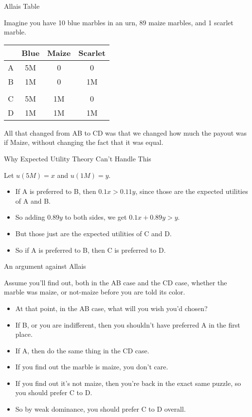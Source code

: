\documentclass[
  ignorenonframetext,
]{beamer}
\providecommand{\tightlist}{%
  \setlength{\itemsep}{0pt}\setlength{\parskip}{0pt}}
\renewcommand{\,}{\text{, }}
\begin{document}
\begin{frame}{Allais Table}
\protect\hypertarget{allais-table}{}

Imagine you have 10 blue marbles in an urn, 89 maize marbles, and 1
scarlet marble.

\begin{longtable}[]{@{}cccc@{}}
\toprule
& Blue & Maize & Scarlet\tabularnewline
\midrule
\endhead
A & 5M & 0 & 0\tabularnewline
B & 1M & 0 & 1M\tabularnewline
& & &\tabularnewline
C & 5M & 1M & 0\tabularnewline
D & 1M & 1M & 1M\tabularnewline
\bottomrule
\end{longtable}

All that changed from AB to CD was that we changed how much the payout
was if Maize, without changing the fact that it was equal.

\end{frame}

\begin{frame}{Why Expected Utility Theory Can't Handle This}
\protect\hypertarget{why-expected-utility-theory-cant-handle-this}{}

Let \(u(5M) = x\) and \(u(1M) = y\).

\begin{itemize}
\tightlist
\item
  If A is preferred to B, then \(0.1x > 0.11y\), since those are the
  expected utilities of A and B. \pause
\item
  So adding \(0.89y\) to both sides, we get \(0.1x + 0.89y > y\). \pause
\item
  But those just are the expected utilities of C and D.
\item
  So if A is preferred to B, then C is preferred to D.
\end{itemize}

\end{frame}

\begin{frame}{An argument against Allais}
\protect\hypertarget{an-argument-against-allais}{}

Assume you'll find out, both in the AB case and the CD case, whether the
marble was maize, or not-maize before you are told its color.

\begin{itemize}
\tightlist
\item
  At that point, in the AB case, what will you wish you'd chosen? \pause
\item
  If B, or you are indifferent, then you shouldn't have preferred A in
  the first place. \pause
\item
  If A, then do the same thing in the CD case.
\item
  If you find out the marble is maize, you don't care.
\item
  If you find out it's not maize, then you're back in the exact same
  puzzle, so you should prefer C to D.
\item
  So by weak dominance, you should prefer C to D overall.
\end{itemize}

\end{frame}
\end{document}
